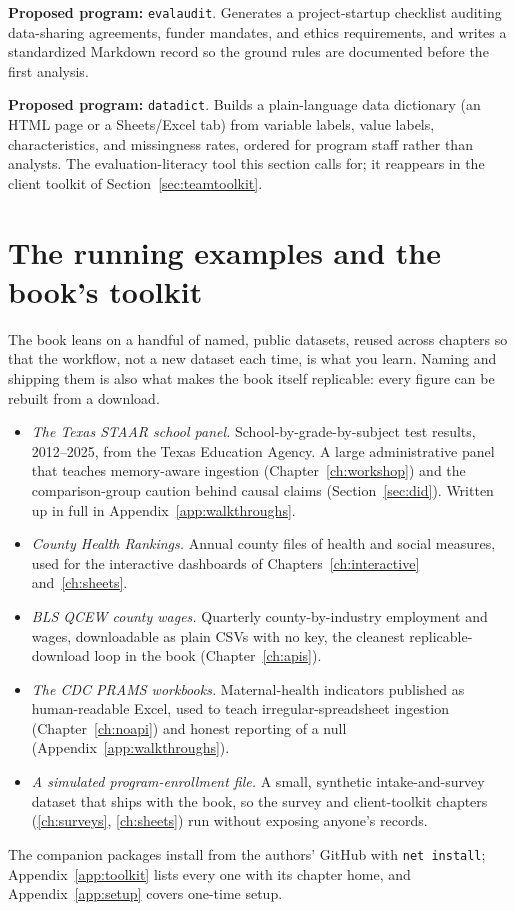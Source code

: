 \documentclass[
    a4paper,
    fontsize=10pt,
    twoside=true,
    numbers=noenddot,
]{kaobook}
\begin{document}
\begin{kaobox}[frametitle=Ado-file Idea: \texttt{evalaudit}]
\textbf{Proposed program:} \texttt{evalaudit}. Generates a project-startup checklist auditing data-sharing agreements, funder mandates, and ethics requirements, and writes a standardized Markdown record so the ground rules are documented before the first analysis.
\end{kaobox}

\begin{kaobox}[frametitle=Ado-file Idea: \texttt{datadict}]
\textbf{Proposed program:} \texttt{datadict}. Builds a plain-language data dictionary (an HTML page or a Sheets/Excel tab) from variable labels, value labels, characteristics, and missingness rates, ordered for program staff rather than analysts. The evaluation-literacy tool this section calls for; it reappears in the client toolkit of Section~\ref{sec:teamtoolkit}.
\end{kaobox}

\section{The running examples and the book's toolkit}
The book leans on a handful of named, public datasets, reused across chapters so that the workflow, not a new dataset each time, is what you learn. Naming and shipping them is also what makes the book itself replicable: every figure can be rebuilt from a download.
\begin{itemize}
    \item \emph{The Texas STAAR school panel.} School-by-grade-by-subject test results, 2012--2025, from the Texas Education Agency. A large administrative panel that teaches memory-aware ingestion (Chapter~\ref{ch:workshop}) and the comparison-group caution behind causal claims (Section~\ref{sec:did}). Written up in full in Appendix~\ref{app:walkthroughs}.
    \item \emph{County Health Rankings.} Annual county files of health and social measures, used for the interactive dashboards of Chapters~\ref{ch:interactive} and~\ref{ch:sheets}.
    \item \emph{BLS QCEW county wages.} Quarterly county-by-industry employment and wages, downloadable as plain CSVs with no key, the cleanest replicable-download loop in the book (Chapter~\ref{ch:apis}).
    \item \emph{The CDC PRAMS workbooks.} Maternal-health indicators published as human-readable Excel, used to teach irregular-spreadsheet ingestion (Chapter~\ref{ch:noapi}) and honest reporting of a null (Appendix~\ref{app:walkthroughs}).
    \item \emph{A simulated program-enrollment file.} A small, synthetic intake-and-survey dataset that ships with the book, so the survey and client-toolkit chapters (\ref{ch:surveys}, \ref{ch:sheets}) run without exposing anyone's records.
\end{itemize}
The companion packages install from the authors' GitHub with \texttt{net install}; Appendix~\ref{app:toolkit} lists every one with its chapter home, and Appendix~\ref{app:setup} covers one-time setup.
\end{document}
